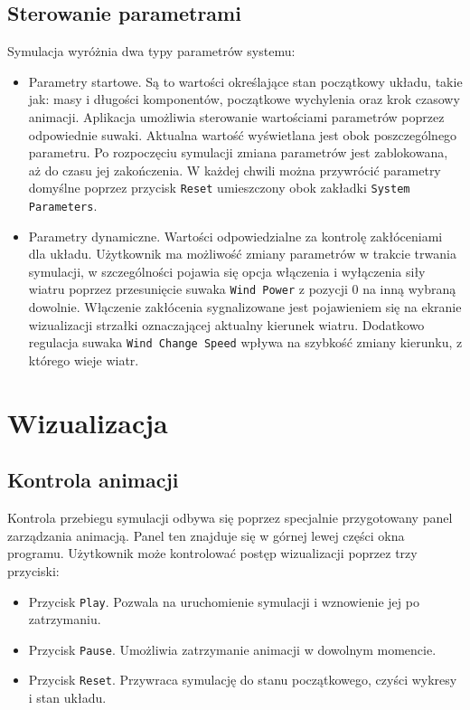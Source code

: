\documentclass[12pt, oneside]{report}
\theoremstyle{definition}
\begin{document}
\subsection{Sterowanie parametrami}
Symulacja wyróżnia dwa typy parametrów systemu:
\begin{itemize}
\item Parametry startowe. Są to wartości określające stan początkowy układu, takie jak: masy i długości komponentów, początkowe wychylenia oraz krok czasowy animacji. Aplikacja umożliwia sterowanie wartościami parametrów poprzez odpowiednie suwaki. Aktualna wartość wyświetlana jest obok poszczególnego parametru. Po rozpoczęciu symulacji zmiana parametrów jest zablokowana, aż do czasu jej zakończenia. W każdej chwili można przywrócić parametry domyślne poprzez przycisk \texttt{Reset} umieszczony obok zakładki \texttt{System Parameters}.
\item Parametry dynamiczne. Wartości odpowiedzialne za kontrolę zakłóceniami dla układu. Użytkownik ma możliwość zmiany parametrów w trakcie trwania symulacji, w szczególności pojawia się opcja włączenia i wyłączenia siły wiatru poprzez przesunięcie suwaka \texttt{Wind Power} z pozycji 0 na inną wybraną dowolnie. Włączenie zakłócenia sygnalizowane jest pojawieniem się na ekranie wizualizacji strzałki oznaczającej aktualny kierunek wiatru. Dodatkowo regulacja suwaka \texttt{Wind Change Speed} wpływa na szybkość zmiany kierunku, z którego wieje wiatr.
\end{itemize}

\section{Wizualizacja}
\subsection{Kontrola animacji}
Kontrola przebiegu symulacji odbywa się poprzez specjalnie przygotowany panel zarządzania animacją. Panel ten znajduje się w górnej lewej części okna programu. Użytkownik może kontrolować postęp wizualizacji poprzez trzy przyciski:
\begin{itemize}
\item Przycisk \texttt{Play}. Pozwala na uruchomienie symulacji i wznowienie jej po zatrzymaniu.
\item Przycisk \texttt{Pause}. Umożliwia zatrzymanie animacji w dowolnym momencie.
\item Przycisk \texttt{Reset}. Przywraca symulację do stanu początkowego, czyści wykresy i stan układu.
\end{itemize}
\end{document}
